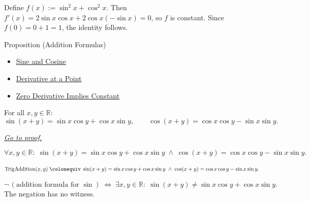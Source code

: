 \begin{remark*}
Define $f(x) := \sin^2 x + \cos^2 x$. Then $f'(x) = 2\sin x \cos x
+ 2\cos x(-\sin x) = 0$, so $f$ is constant. Since $f(0) = 0 + 1 =
1$, the identity follows.
\end{remark*}


\begin{propositionbox}{Proposition (Addition Formulas)}

\begin{dependencies}
\begin{itemize}
  \item \hyperref[def:sine-cosine]{Sine and Cosine}
  \item \hyperref[def:derivative-at-a-point]{Derivative at a Point}
  \item \hyperref[thm:zero-derivative-implies-constant]{Zero Derivative Implies Constant}
\end{itemize}
\end{dependencies}
\begin{proposition}
\label{prop:trig-addition-formulas}
For all $x, y \in \mathbb{R}$:
\[
  \sin(x+y) = \sin x \cos y + \cos x \sin y,
  \qquad
  \cos(x+y) = \cos x \cos y - \sin x \sin y.
\]

\smallskip\noindent
\hyperref[prf:trig-addition-formulas]{\textit{Go to proof.}}
\end{proposition}
\end{propositionbox}\begin{remark*}
\[
  \forall x,y\in\mathbb{R}:\;
  \sin(x+y) = \sin x\cos y + \cos x\sin y
  \;\wedge\;
  \cos(x+y) = \cos x\cos y - \sin x\sin y.
\]
\end{remark*}

\begin{remark*}
\[
  \operatorname{TrigAddition}(x,y)
  \;\colonequiv\;
  \sin(x+y) = \sin x\cos y + \cos x\sin y
  \;\wedge\;
  \cos(x+y) = \cos x\cos y - \sin x\sin y.
\]
\end{remark*}

\begin{remark*}
\[
  \neg\,(\text{addition formula for }\sin)
  \;\iff\;
  \exists x,y\in\mathbb{R}:\;
  \sin(x+y) \neq \sin x\cos y + \cos x\sin y.
\]
The negation has no witness.
\end{remark*}

